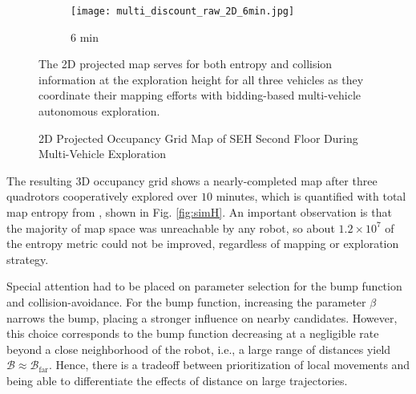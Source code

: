\begin{figure}[!t]
{    	\begin{subfigure}[t]{0.25\columnwidth}
          	\texttt{[image: multi\_discount\_raw\_2D\_6min.jpg]}
        		\caption{$6$ min}
    	\end{subfigure}
	}
	\caption{2D Projected Occupancy Grid Map of SEH Second Floor During Multi-Vehicle Exploration}
	\medskip
	\small
	The 2D projected map serves for both entropy and collision information at the exploration height for all three vehicles as they coordinate their mapping efforts with bidding-based multi-vehicle autonomous exploration.
	\label{fig:sim2Dmaps}
\end{figure}

	
	
The resulting 3D occupancy grid shows a nearly-completed map after three quadrotors cooperatively explored over $10$ minutes, which is quantified with total map entropy from , shown in Fig. \ref{fig:simH}. An important observation is that the majority of map space was unreachable by any robot, so about $1.2\times10^7$ of the entropy metric could not be improved, regardless of mapping or exploration strategy.

Special attention had to be placed on parameter selection for the bump function and collision-avoidance. For the bump function, increasing the parameter $\beta$ narrows the bump, placing a stronger influence on nearby candidates. However, this choice corresponds to the bump function decreasing at a negligible rate beyond a close neighborhood of the robot, i.e., a large range of distances yield $\mathcal B\approx\mathcal B_\text{far}$. Hence, there is a tradeoff between prioritization of local movements and being able to differentiate the effects of distance on large trajectories.

